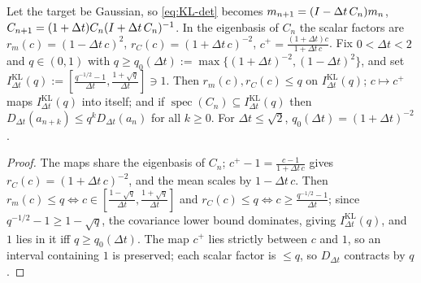 \begin{proposition}
\label{prop:kl-gauss}
Let the target be Gaussian, so \eqref{eq:KL-det} becomes
$m_{n+1}=(I-\Delta t\,C_n)m_n$, $C_{n+1}=(1+\Delta t)C_n(I+\Delta t\,C_n)^{-1}$. In the
eigenbasis of $C_n$ the scalar factors are
$r_m(c)=(1-\Delta t\,c)^2$, $r_C(c)=(1+\Delta t\,c)^{-2}$, $c^+=\tfrac{(1+\Delta t)c}{1+\Delta t\,c}$.
Fix $0<\Delta t<2$ and $q\in(0,1)$ with $q\geq q_0(\Delta t):=\max\{(1+\Delta t)^{-2},(1-\Delta t)^2\}$,
and set $I_{\Delta t}^{\mathrm{KL}}(q):=[\tfrac{q^{-1/2}-1}{\Delta t},\tfrac{1+\sqrt q}{\Delta t}]\ni1$.
Then $r_m(c),r_C(c)\leq q$ on $I_{\Delta t}^{\mathrm{KL}}(q)$; $c\mapsto c^+$ maps
$I_{\Delta t}^{\mathrm{KL}}(q)$ into itself; and if $\operatorname{spec}(C_n)\subseteq I_{\Delta t}^{\mathrm{KL}}(q)$
then $D_{\Delta t}(a_{n+k})\leq q^kD_{\Delta t}(a_n)$ for all $k\geq0$. For $\Delta t\leq\sqrt2$,
$q_0(\Delta t)=(1+\Delta t)^{-2}$.
\end{proposition}

\begin{proof}
The maps share the eigenbasis of $C_n$; $c^+-1=\tfrac{c-1}{1+\Delta t\,c}$ gives $r_C(c)=(1+\Delta t\,c)^{-2}$,
and the mean scales by $1-\Delta t\,c$. Then $r_m(c)\leq q\Leftrightarrow c\in[\tfrac{1-\sqrt q}{\Delta t},\tfrac{1+\sqrt q}{\Delta t}]$
and $r_C(c)\leq q\Leftrightarrow c\geq\tfrac{q^{-1/2}-1}{\Delta t}$; since $q^{-1/2}-1\geq1-\sqrt q$, the
covariance lower bound dominates, giving $I_{\Delta t}^{\mathrm{KL}}(q)$, and $1$ lies in it iff
$q\geq q_0(\Delta t)$. The map $c^+$ lies strictly between $c$ and $1$, so an interval containing $1$
is preserved; each scalar factor is $\leq q$, so $D_{\Delta t}$ contracts by $q$.
\end{proof}

